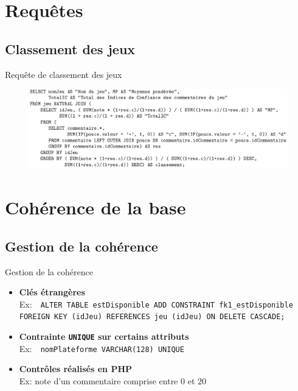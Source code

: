 \documentclass{beamer}
\begin{document}
\section{Requêtes}
\subsection{Classement des jeux}
\begin{frame}
\begin{block}{Requête de classement des jeux}
\begin{center}
\begin{figure}[t]
  \includegraphics[scale=0.3]{requete.png}
\end{figure}
\end{center}
\end{block}
\end{frame}


\section{Cohérence de la base}
\subsection{Gestion de la cohérence}
\begin{frame}
\begin{block}{Gestion de la cohérence}
\begin{itemize}
  \item {\textbf{Clés étrangères} \\
    \footnotesize{Ex:~~\texttt{ALTER TABLE estDisponible ADD CONSTRAINT fk1\_estDisponible FOREIGN KEY (idJeu) REFERENCES jeu (idJeu) ON DELETE CASCADE;}}}
  \item{  \textbf{Contrainte \texttt{UNIQUE} sur certains attributs}\\
    \footnotesize{Ex:~~\texttt{nomPlateforme VARCHAR(128) UNIQUE}}}
  \item {\textbf{Contrôles réalisés en PHP}\\
    \footnotesize{Ex: note d'un commentaire comprise entre $0$ et $20$}}

\end{itemize}
\end{block}
\end{frame}
\end{document}
